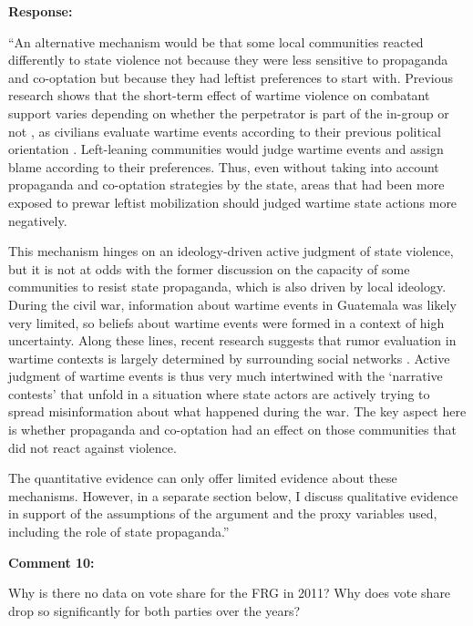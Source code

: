 \documentclass[12pt, a4paper, notitlepage]{article}
\begin{document}
\noindent\textbf{Response:}


``An alternative mechanism would be that some local communities reacted differently to state violence not because they were less sensitive to propaganda and co-optation but because they had leftist preferences to start with.
Previous research shows that the short-term effect of wartime violence on combatant support varies depending on whether the perpetrator is part of the in-group or not \citep{Lyall:2013aa}, as civilians evaluate wartime events according to their previous political orientation \citep{Silverman:2019aa, Pechenkina:2020ul}.
Left-leaning communities would judge wartime events and assign blame according to their preferences.
Thus, even without taking into account propaganda and co-optation strategies by the state, areas that had been more exposed to prewar leftist mobilization should judged wartime state actions more negatively.

This mechanism hinges on an ideology-driven active judgment of state violence, but it is not at odds with the former discussion on the capacity of some communities to resist state propaganda, which is also driven by local ideology.
During the civil war, information about wartime events in Guatemala was likely very limited, so beliefs about wartime events were formed in a context of high uncertainty.
Along these lines, recent research suggests that rumor evaluation in wartime contexts is largely determined by surrounding social networks \citep{Schon:2021wf}.
Active judgment of wartime events is thus very much intertwined with the `narrative contests' that unfold in a situation where state actors are actively trying to spread misinformation about what happened during the war.
The key aspect here is whether propaganda and co-optation had an effect on those communities that did not react against violence.

The quantitative evidence can only offer limited evidence about these mechanisms.
However, in a separate section below, I discuss qualitative evidence in support of the assumptions of the argument and the proxy variables used, including the role of state propaganda.''


\vspace{15pt}
\noindent\textbf{Comment 10:}
\begin{displayquote}
Why is there no data on vote share for the FRG in 2011? Why does vote share drop so significantly for both parties over the years?
\end{displayquote}
\end{document}
